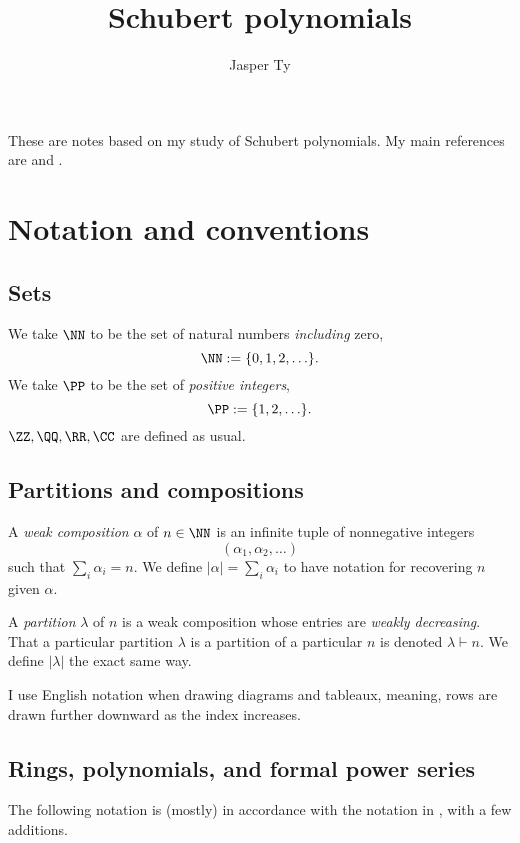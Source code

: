 \documentclass{article}
\title{Schubert polynomials}
\author{Jasper Ty}
\date{}
\begin{document}
\maketitle

These are notes based on my study of Schubert polynomials. My main references are \cite{KnutsonSchubertPolynomials} and \cite{MacdonaldSchubertPolynomials}.

\tableofcontents

\section{Notation and conventions}

\subsection{Sets}

We take $\NN$ to be the set of natural numbers \textit{including} zero,
\[
    \NN := \{0,1,2,\ldots\}.
\]
We take $\PP$ to be the set of \textit{positive integers},
\[
    \PP := \{1,2,\ldots\}.
\]
$\ZZ,\QQ,\RR,\CC$ are defined as usual.

\subsection{Partitions and compositions}

A \textit{weak composition} $\alpha$ of $n \in \NN$ is an infinite tuple of nonnegative integers 
\[
    (\alpha_1, \alpha_2, \ldots)
\]
such that $\sum_i \alpha_i = n$. 
We define $|\alpha| = \sum_i \alpha_i$ to have notation for recovering $n$ given $\alpha$.

A \textit{partition} $\lambda$ of $n$ is a weak composition whose entries are \textit{weakly decreasing}. 
That a particular partition $\lambda$ is a partition of a particular $n$ is denoted $\lambda \vdash n$. 
We define $|\lambda|$ the exact same way.

I use English notation when drawing diagrams and tableaux, meaning, rows are drawn further downward as the index increases.

\subsection{Rings, polynomials, and formal power series}

The following notation is (mostly) in accordance with the notation in \cite{DarijAC}, with a few additions. 
\end{document}

